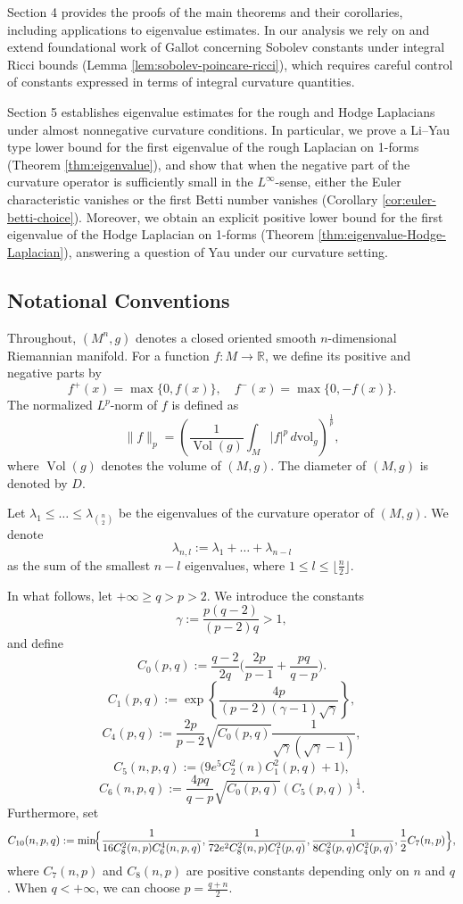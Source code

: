 \documentclass[12pt, twoside]{article}
\theoremstyle{definition}
\numberwithin{equation}{section}
\begin{document}
Section 4 provides the proofs of the main theorems and their corollaries, including applications to eigenvalue estimates. In our analysis we rely on and extend foundational work of Gallot \cite{Gallot1988} concerning Sobolev constants under integral Ricci bounds (Lemma \ref{lem:sobolev-poincare-ricci}), which requires careful control of constants expressed in terms of integral curvature quantities. 

Section 5 establishes eigenvalue estimates for the rough and Hodge Laplacians under almost nonnegative curvature conditions. In particular, we prove a Li–Yau type lower bound for the first eigenvalue of the rough Laplacian on 1-forms (Theorem \ref{thm:eigenvalue}), and show that when the negative part of the curvature operator is sufficiently small in the $L^{\infty}$-sense, either the Euler characteristic vanishes or the first Betti number vanishes (Corollary \ref{cor:euler-betti-choice}). Moreover, we obtain an explicit positive lower bound for the first eigenvalue of the Hodge Laplacian on 1-forms (Theorem \ref{thm:eigenvalue-Hodge-Laplacian}), answering a question of Yau under our curvature setting. 

\subsection*{Notational Conventions}
Throughout, \((M^{n}, g)\) denotes a closed oriented smooth \(n\)-dimensional Riemannian manifold. For a function \(f: M \to \mathbb{R}\), we define its positive and negative parts by
\[
f^{+}(x) = \max\{0, f(x)\}, \quad f^{-}(x) = \max\{0, -f(x)\}.
\]
The normalized \(L^p\)-norm of \(f\) is defined as
\[
\|f\|_p = \left(\frac{1}{\operatorname{Vol}(g)} \int_M |f|^p \, d\mathrm{vol}_g\right)^{\frac{1}{p}},
\]
where \(\operatorname{Vol}(g)\) denotes the volume of \((M,g)\). The diameter of \((M, g)\) is denoted by \(D\).

Let \(\lambda_1 \le \dots \le \lambda_{\binom{n}{2}}\) be the eigenvalues of the curvature operator of \((M,g)\). We denote
\[
\lambda_{n,l} := \lambda_1 + \dots + \lambda_{n-l}
\]
as the sum of the smallest \(n-l\) eigenvalues, where \(1 \leq l \leq \lfloor\frac{n}{2}\rfloor\).

In what follows, let \(+\infty \geq q > p > 2\). We introduce the constants
\[
\gamma := \frac{p(q-2)}{(p-2)q} > 1,
\]
and define
\[C_{0}(p,q):=\frac{q-2}{2q}\Big(\frac{2p}{p-1}+\frac{pq}{q-p}\Bigr).\]
\[
C_{1}(p,q) := \exp\left\{\frac{4p}{(p-2)(\gamma-1)\sqrt{\gamma}}\right\},
\]
\[C_4(p,q):=\frac{2p}{p-2}\sqrt{C_{0}(p,q)} 
\frac{1}{\sqrt{\gamma}(\sqrt{\gamma}-1)} ,\]
\[
C_5(n,p,q) := \bigl(9e^5 C_2^2(n) C^2_1(p,q)+1\bigr),
\]
\[
C_{6}(n,p,q):=\frac{4pq}{q-p}\sqrt{C_{0}(p,q)}(C_{5}(p,q))^{\frac{1}{4}}.
\]
Furthermore, set
 \[C_{10}(n,p,q):=
\min\!\Bigl\{\frac{1}{16C^{2}_{8}(n,p)C^{4}_{6}(n,p,q)},\frac{1}{72e^{2}C^{2}_8(n,p) C^{2}_{1}(p,q)},\frac{1}{8C_8^{2}(p,q) C^{2}_{4}(p,q)},\frac{1}{2}C_{7}(n,p)\Bigr\},
\]
where \(C_7(n,p)\) and \(C_8(n,p)\) are positive constants depending only on $n$ and $q$. When $q<+\infty$, we can choose $p=\frac{q+n}{2}$.
\end{document}
